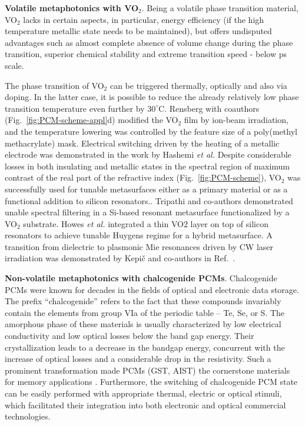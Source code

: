\documentclass[journal=chreay,manuscript=review]{achemso}
\begin{document}
{\bf Volatile metaphotonics with VO$_2$}. Being a volatile phase transition material, VO$_2$ lacks in certain aspects, in particular, energy efficiency (if the high temperature metallic state needs to be maintained), but offers undisputed advantages such as almost complete absence of volume change during the phase transition, superior chemical stability and extreme transition speed - below ps scale\cite{wegkamp2015ultrafast, jager2017tracking}. 

The phase transition of VO$_2$ can be triggered thermally, optically and also via doping. In the latter case, it is possible to reduce the already relatively low phase transition temperature even further by $30^\circ$C. Rensberg with coauthors\cite{rensberg2016active} (Fig.~\ref{fig:PCM-scheme-appl}d) modified the VO$_2$ film by ion-beam irradiation, and the temperature lowering was controlled by the feature size of a poly(methyl methacrylate) mask. Electrical switching driven by the heating of a metallic electrode was demonstrated in the work by Hashemi \textit{et al.} \cite{hashemi2016electronically}
Despite considerable losses in both insulating and metallic states in the spectral region of maximum contrast of the real part of the refractive index (Fig.~\ref{fig:PCM-scheme}), VO$_2$ was successfully used for tunable metasurfaces either as a primary material \cite{kepic2021optically} or as a functional addition to silicon resonators.\cite{howes2020optical,tripathi2021tunable}. Tripathi and co-authors\cite{tripathi2021tunable} demonstrated unable spectral filtering in a Si-based resonant metasurface functionalized by a VO$_2$ substrate. Howes \textit{et al.} integrated a thin VO$2$ layer on top of silicon resonators to achieve tunable Huygens regime for a hybrid metasurface\cite{howes2020optical}. A transition from dielectric to plasmonic Mie resonances driven by CW laser irradiation was demonstrated by Kepi\v{c} and co-authors in Ref.~.

{\bf Non-volatile metaphotonics with chalcogenide PCMs}. Chalcogenide PCMs were known for decades in the fields of optical and electronic data storage. The prefix ``chalcogenide'' refers to the fact that these compounds invariably contain the elements from group VIa of the periodic table – Te, Se, or S. The amorphous phase of these materials is usually characterized by low electrical conductivity and low optical losses below the band gap energy. Their crystallization leads to a decrease in the bandgap energy, concurrent with the increase of optical losses and a considerable drop in the resistivity. Such a prominent transformation made PCMs (GST, AIST) the cornerstone materials for memory applications \cite{wuttig2007phase,driscoll2009memory}. Furthermore, the switching of chalcogenide PCM state can be easily performed with appropriate thermal, electric or optical stimuli, which facilitated their integration  into both electronic and optical commercial technologies.
\end{document}
